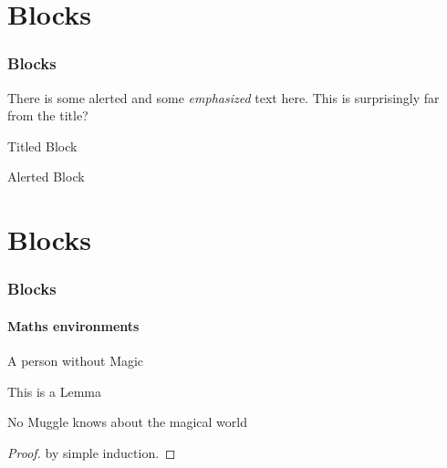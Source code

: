 \documentclass[
aspectratio=169,
]{beamer}
\begin{document}
\section{Blocks}
\begin{frame}
\frametitle{Blocks}
There is some \alert{alerted} and some \emph{emphasized} text here. This is surprisingly far from the title?
\begin{block}{Titled Block}
    \lipsum[1][1-2] 
\end{block}
\begin{alertblock}{Alerted Block}
    \lipsum[1][1-2] 
\end{alertblock}
\begin{example}[Muggle]
\end{example}

\end{frame}


\section{Blocks}

\begin{frame}
\frametitle{Blocks}
\framesubtitle{Maths environments}

\begin{definition}[Muggle]
A person without Magic
\end{definition}

\begin{lemma}
    This is a Lemma
\end{lemma}
\begin{theorem}
No Muggle knows about the magical world
\end{theorem} 
\begin{proof}
    by simple induction.
\end{proof}

\end{frame}

%
\end{document}
